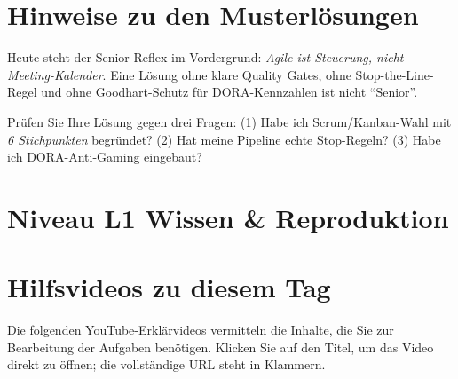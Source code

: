 \documentclass[11pt,a4paper,oneside]{article}
\begin{document}
\section*{Hinweise zu den Musterl\"osungen}
\thispagestyle{plain}

\noindent Heute steht der Senior-Reflex im Vordergrund: \emph{Agile ist Steuerung, nicht Meeting-Kalender}. Eine L\"osung ohne klare Quality Gates, ohne Stop-the-Line-Regel und ohne Goodhart-Schutz f\"ur DORA-Kennzahlen ist nicht ``Senior''.

\begin{infobox}
Pr\"ufen Sie Ihre L\"osung gegen drei Fragen: (1) Habe ich Scrum/Kanban-Wahl mit \emph{6 Stichpunkten} begr\"undet? (2) Hat meine Pipeline echte Stop-Regeln? (3) Habe ich DORA-Anti-Gaming eingebaut?
\end{infobox}

\clearpage

\section*{Niveau L1 \textendash{} Wissen \& Reproduktion}

\section*{Hilfsvideos zu diesem Tag}
\thispagestyle{plain}

\noindent Die folgenden YouTube-Erkl\"arvideos vermitteln die Inhalte, die Sie zur Bearbeitung der Aufgaben ben\"otigen. Klicken Sie auf den Titel, um das Video direkt zu \"offnen; die vollst\"andige URL steht in Klammern.
\end{document}
